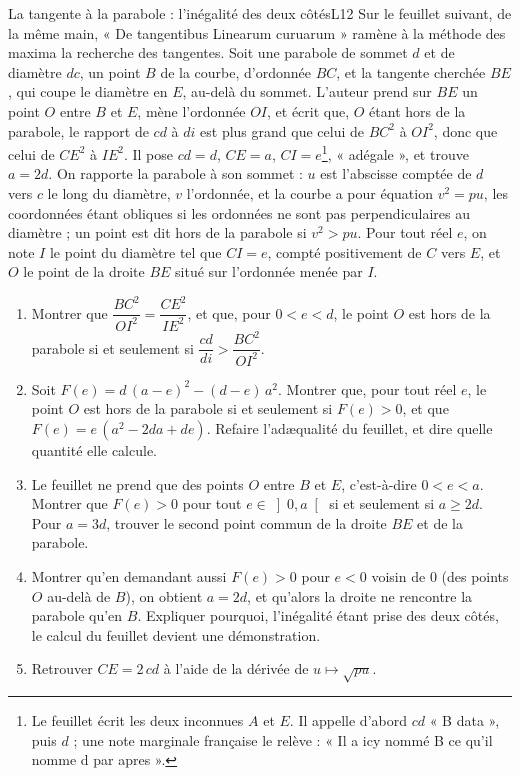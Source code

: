 \documentclass[11pt,a4paper]{article}
\begin{document}
\begin{exercice}{La tangente à la parabole : l'inégalité des deux côtés}{L1}{2}
Sur le feuillet suivant, de la même main, « De tangentibus Linearum curuarum »
ramène à la méthode des maxima la recherche des tangentes. Soit une parabole de
sommet $d$ et de diamètre $dc$, un point $B$ de la courbe, d'ordonnée $BC$, et
la tangente cherchée $BE$, qui coupe le diamètre en $E$, au-delà du sommet.
L'auteur prend sur $BE$ un point $O$ entre $B$ et $E$, mène l'ordonnée $OI$, et
écrit que, $O$ étant hors de la parabole, le rapport de $cd$ à $di$ est plus
grand que celui de $BC^2$ à $OI^2$, donc que celui de $CE^2$ à $IE^2$. Il pose
$cd = d$, $CE = a$, $CI = e$\footnote{Le feuillet écrit les deux inconnues $A$ et
$E$. Il appelle d'abord $cd$ « B data », puis $d$ ; une note marginale française
le relève : « Il a icy nommé B ce qu'il nomme d par apres ».}, « adégale », et
trouve $a = 2d$. On rapporte la parabole à son sommet : $u$ est l'abscisse
comptée de $d$ vers $c$ le long du diamètre, $v$ l'ordonnée, et la courbe a pour
équation $v^2 = pu$, les coordonnées étant obliques si les ordonnées ne sont pas
perpendiculaires au diamètre ; un point est dit hors de la parabole si
$v^2 > pu$. Pour tout réel $e$, on note $I$ le point du diamètre tel que
$CI = e$, compté positivement de $C$ vers $E$, et $O$ le point de la droite $BE$
situé sur l'ordonnée menée par $I$.


\begin{enumerate}
\item Montrer que $\dfrac{BC^2}{OI^2} = \dfrac{CE^2}{IE^2}$, et que, pour
  $0 < e < d$, le point $O$ est hors de la parabole si et seulement si
  $\dfrac{cd}{di} > \dfrac{BC^2}{OI^2}$.
\item Soit $F(e) = d\,(a - e)^2 - (d - e)\,a^2$. Montrer que, pour tout réel
  $e$, le point $O$ est hors de la parabole si et seulement si $F(e) > 0$, et
  que $F(e) = e\,(a^2 - 2da + de)$. Refaire l'adæqualité du feuillet, et dire
  quelle quantité elle calcule.
\item Le feuillet ne prend que des points $O$ entre $B$ et $E$, c'est-à-dire
  $0 < e < a$. Montrer que $F(e) > 0$ pour tout $e \in \left]0, a\right[$ si et
  seulement si $a \ge 2d$. Pour $a = 3d$, trouver le second point commun de la
  droite $BE$ et de la parabole.
\item Montrer qu'en demandant aussi $F(e) > 0$ pour $e < 0$ voisin de $0$ (des
  points $O$ au-delà de $B$), on obtient $a = 2d$, et qu'alors la droite ne
  rencontre la parabole qu'en $B$. Expliquer pourquoi, l'inégalité étant prise
  des deux côtés, le calcul du feuillet devient une démonstration.
\item Retrouver $CE = 2\,cd$ à l'aide de la dérivée de $u \mapsto \sqrt{pu}$.
\end{enumerate}
\end{exercice}
\end{document}
